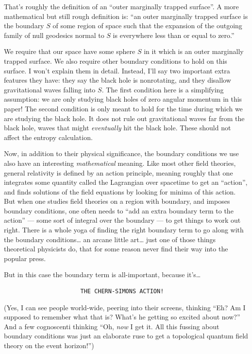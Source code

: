 \documentclass{article}
\begin{document}
That's roughly the definition of an ``outer marginally trapped
surface''. A more mathematical but still rough definition is: ``an outer
marginally trapped surface is the boundary \(S\) of some region of space
such that the expansion of the outgoing family of null geodesics normal
to \(S\) is everywhere less than or equal to zero.''

We require that our space have some sphere \(S\) in it which is an outer
marginally trapped surface. We also require other boundary conditions to
hold on this surface. I won't explain them in detail. Instead, I'll say
two important extra features they have: they say the black hole is
nonrotating, and they disallow gravitational waves falling into \(S\).
The first condition here is a simplifying assumption: we are only
studying black holes of zero angular momentum in this paper! The second
condition is only meant to hold for the time during which we are
studying the black hole. It does not rule out gravitational waves far
from the black hole, waves that might \emph{eventually} hit the black
hole. These should not affect the entropy calculation.

Now, in addition to their physical significance, the boundary conditions
we use also have an interesting \emph{mathematical} meaning. Like most
other field theories, general relativity is defined by an action
principle, meaning roughly that one integrates some quantity called the
Lagrangian over spacetime to get an ``action'', and finds solutions of
the field equations by looking for minima of this action. But when one
studies field theories on a region with boundary, and imposes boundary
conditions, one often needs to ``add an extra boundary term to the
action'' --- some sort of integral over the boundary --- to get things
to work out right. There is a whole yoga of finding the right boundary
term to go along with the boundary conditions\ldots{} an arcane little
art\ldots{} just one of those things theoretical physicists do, that for
some reason never find their way into the popular press.

But in this case the boundary term is all-important, because
it's\ldots{}

\begin{verbatim}
                      THE CHERN-SIMONS ACTION!
\end{verbatim}

(Yes, I can see people world-wide, peering into their screens, thinking
``Eh? Am I supposed to remember what that is? What's he getting so
excited about now?'' And a few cognoscenti thinking ``Oh, \emph{now} I
get it. All this fussing about boundary conditions was just an elaborate
ruse to get a topological quantum field theory on the event horizon!'')
\end{document}
